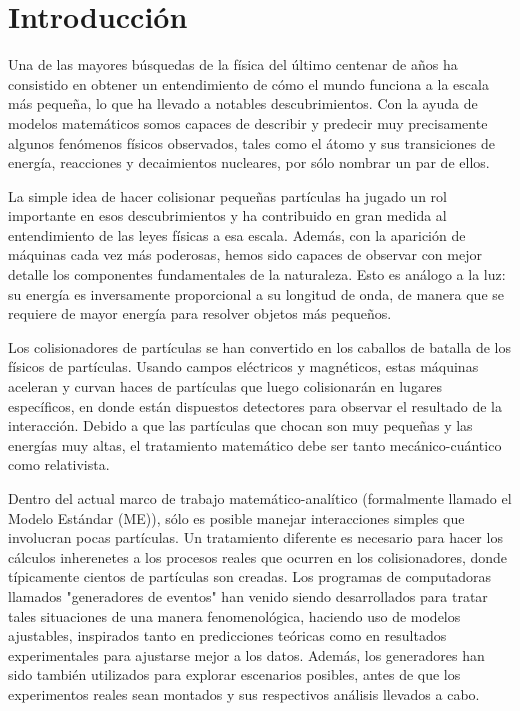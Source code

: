 \documentclass[a4paper,12pt]{article}
\begin{document}
\newpage

\tableofcontents

\newpage

\section{Introducción}
\label{sec:introduction}

Una de las mayores búsquedas de la física del último centenar de años ha consistido en obtener un entendimiento de cómo el mundo funciona a la escala más pequeña, lo que ha llevado a notables descubrimientos. Con la ayuda de modelos matemáticos somos capaces de describir y predecir muy precisamente algunos fenómenos físicos observados, tales como el átomo y sus transiciones de energía, reacciones y decaimientos nucleares, por sólo nombrar un par de ellos.

La simple idea de hacer colisionar pequeñas partículas ha jugado un rol importante en esos descubrimientos y ha contribuido en gran medida al entendimiento de las leyes físicas a esa escala. Además, con la aparición de máquinas cada vez más poderosas, hemos sido capaces de observar con mejor detalle los componentes fundamentales de la naturaleza. Esto es análogo a la luz: su energía es inversamente proporcional a su longitud de onda, de manera que se requiere de mayor energía para resolver objetos más pequeños.

Los colisionadores de partículas se han convertido en los caballos de batalla de los físicos de partículas. Usando campos eléctricos y magnéticos, estas máquinas aceleran y curvan haces de partículas que luego colisionarán en lugares específicos, en donde están dispuestos detectores para observar el resultado de la interacción. Debido a que las partículas que chocan son muy pequeñas y las energías muy altas, el tratamiento matemático debe ser tanto mecánico-cuántico como relativista.

Dentro del actual marco de trabajo matemático-analítico (formalmente llamado el Modelo Estándar (ME)), sólo es posible manejar interacciones simples que involucran pocas partículas. Un tratamiento diferente es necesario para hacer los cálculos inherenetes a los procesos reales que ocurren en los colisionadores, donde típicamente cientos de partículas son creadas. Los programas de computadoras llamados "generadores de eventos" han venido siendo desarrollados para tratar tales situaciones de una manera fenomenológica, haciendo uso de modelos ajustables, inspirados tanto en predicciones teóricas como en resultados experimentales para ajustarse mejor a los datos. Además, los generadores han sido también utilizados para explorar escenarios posibles, antes de que los experimentos reales sean montados y sus respectivos análisis llevados a cabo.
\end{document}
